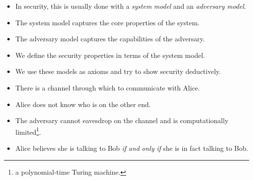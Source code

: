 \begin{frame}
  \begin{itemize}
    \item In security, this is usually done with a \emph{system model} and an 
      \emph{adversary model}.
  \end{itemize}

  \pause

  \begin{definition}
    \begin{itemize}
      \item The system model captures the core properties of the system.
      \item The adversary model captures the capabilities of the adversary.
    \end{itemize}
  \end{definition}

  \pause

  \begin{itemize}
    \item We define the security properties in terms of the system model.
    \item We use these models as axioms and try to show security deductively.
  \end{itemize}
\end{frame}

\begin{frame}
  \begin{example}
    \begin{itemize}
      \item There is a channel through which to communicate with Alice.
      \item Alice does not know who is on the other end.
      \item The adversary cannot eavesdrop on the channel and is 
        computationally limited\footnote{\Ie a polynomial-time Turing 
          machine.}.
    \end{itemize}
  \end{example}

  \begin{example}
    \begin{itemize}
      \item Alice believes she is talking to Bob \emph{if and only if} she is 
        in fact talking to Bob.
    \end{itemize}
  \end{example}
\end{frame}

